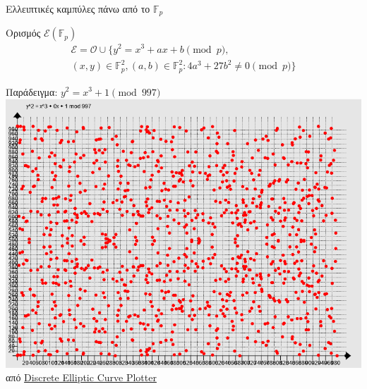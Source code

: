 \documentclass[handout]{beamer}
\begin{document}
\begin{frame}{Ελλειπτικές καμπύλες πάνω από το $\mathbb{F}_p$}

Ορισμός $\mathcal{E}(\mathbb{F}_p)$
\begin{align*}
 \mathcal E = \mathcal O \cup \{  y^2 = x^3 + ax +b \pmod{p},  \\
 (x,y) \in \mathbb{F}_p^2, (a,b) \in \mathbb{F}_p^2:  4a^3+27b^2 \neq 0 \pmod{p} \} 
\end{align*}
\pause
\begin{center}
Παράδειγμα: $y^2 = x^3+1 \pmod{997}$\\
\includegraphics[scale=0.25]{ec997}\\
από \href{http://www.graui.de/elliptic-plot.htm}{Discrete Elliptic Curve Plotter}
\end{center}

\end{frame}
\end{document}
